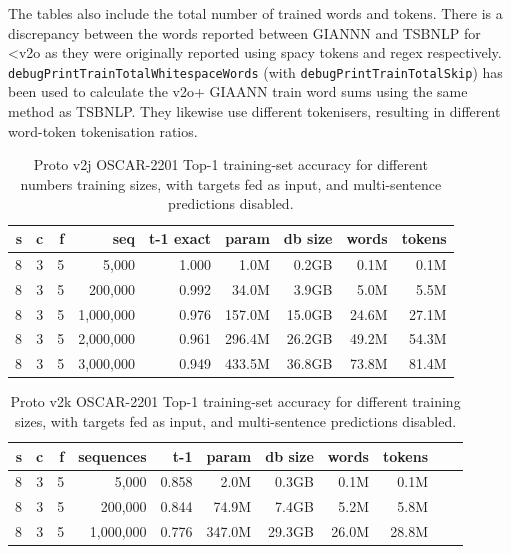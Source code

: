 The tables also include the total number of trained words and tokens. There is a discrepancy between the words reported between GIANNN and TSBNLP for <v2o as they were originally reported using spacy tokens and regex respectively. \texttt{debugPrintTrainTotalWhitespaceWords} (with \texttt{debugPrintTrainTotalSkip}) has been used to calculate the v2o+ GIAANN train word sums using the same method as TSBNLP. They likewise use different tokenisers, resulting in different word-token tokenisation ratios.

\begin{table}[H]
\centering
\caption{Proto v2j OSCAR-2201 Top-1 training-set accuracy for different numbers training sizes, with targets fed as input, and multi-sentence predictions disabled.}
\label{tab:protov2j-oscar-train-top1-accuracy}
\begin{tabular}{rrrrrrrrr}
\toprule
\textbf{s} & \textbf{c} & \textbf{f} & \textbf{seq} & \textbf{t-1 exact} & \textbf{param} & \textbf{db size} & \textbf{words} & \textbf{tokens} \\
\midrule
8 & 3 & 5 & 5,000     & 1.000 & 1.0M & 0.2GB & 0.1M & 0.1M \\
8 & 3 & 5 & 200,000   & 0.992 & 34.0M & 3.9GB & 5.0M & 5.5M \\
8 & 3 & 5 & 1,000,000 & 0.976 & 157.0M & 15.0GB & 24.6M & 27.1M \\
8 & 3 & 5 & 2,000,000 & 0.961 & 296.4M & 26.2GB & 49.2M & 54.3M \\
8 & 3 & 5 & 3,000,000 & 0.949 & 433.5M & 36.8GB & 73.8M & 81.4M \\
\bottomrule
\end{tabular}
\end{table}

\begin{table}[H]
\centering
\caption{Proto v2k OSCAR-2201 Top-1 training-set accuracy for different training sizes, with targets fed as input, and multi-sentence predictions disabled.}
\label{tab:protov2k-oscar-train-top1-accuracy}
\begin{tabular}{rrrrrrrrrrr}
\toprule
\textbf{s} & \textbf{c} & \textbf{f} & \textbf{sequences} & \textbf{t-1} & \textbf{param} & \textbf{db size} & \textbf{words} & \textbf{tokens} \\
\midrule
8 & 3 & 5 & 5,000     & 0.858 & 2.0M & 0.3GB & 0.1M & 0.1M \\
8 & 3 & 5 & 200,000   & 0.844 & 74.9M & 7.4GB &	5.2M & 5.8M \\
8 & 3 & 5 & 1,000,000 & 0.776 & 347.0M & 29.3GB & 26.0M & 28.8M \\
\bottomrule
\end{tabular}
\end{table}

